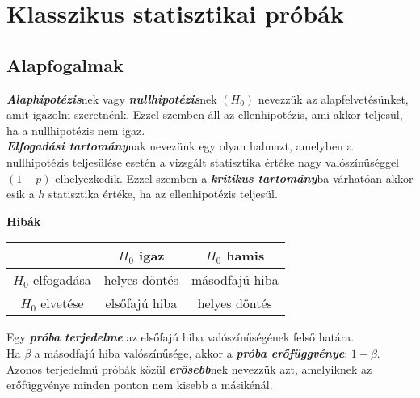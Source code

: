 \documentclass[tikz,12pt,margin=0px]{article}
\begin{document}
	\section*{Klasszikus statisztikai próbák}
	
    \subsection*{Alapfogalmak\\}

    \noindent \textbf{\emph{Alaphipotézis}}nek vagy \textbf{\emph{nullhipotézis}}nek $(H_0)$ nevezzük az alapfelvetésünket, amit igazolni szeretnénk. Ezzel szemben áll az ellenhipotézis, ami akkor teljesül, ha a nullhipotézis nem igaz.\\

    \noindent \emph{\textbf{Elfogadási tartomány}}nak nevezünk egy olyan halmazt, amelyben a nullhipotézis teljesülése esetén a vizsgált statisztika értéke nagy valószínűséggel $(1-p)$ elhelyezkedik. Ezzel szemben a \textbf{\emph{kritikus tartomány}}ba várhatóan akkor esik a $h$ statisztika értéke, ha az ellenhipotézis teljesül.

    \begin{center}
        \noindent \textbf{Hibák} \qquad
      \begin{tabular}{c|cc}
         & $H_0$ igaz & $H_0$ hamis \\ \hline
        $H_0$ elfogadása & helyes döntés & másodfajú hiba \\
        $H_0$ elvetése & elsőfajú hiba & helyes döntés \\
      \end{tabular}
    \end{center}

    \noindent Egy \textbf{\emph{próba terjedelme}} az elsőfajú hiba valószínűségének felső határa.\\

    \noindent Ha $\beta$ a másodfajú hiba valószínűsége, akkor a \textbf{\emph{próba erőfüggvénye}}: $1 - \beta$.\\

    \noindent Azonos terjedelmű próbák közül \textbf{\emph{erősebb}}nek nevezzük azt, amelyiknek az erőfüggvénye minden ponton nem kisebb a másikénál.\\
\end{document}

